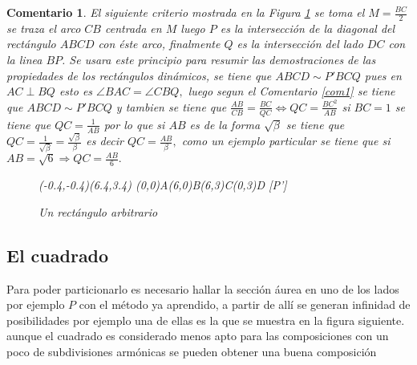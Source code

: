 \documentclass[a4paper]{book}
\newtheorem{comen}{Comentario}[chapter]
\begin{document}
\begin{comen}

	El siguiente criterio mostrada en la Figura \ref{Upu} se toma el $M=\frac{BC}{2}$ se traza el arco $CB$ centrada en $M$ luego $P$ es la intersección de la diagonal del rectángulo $ABCD$ con éste arco, finalmente $Q$ es la intersección del lado $DC$ con la linea $BP$. Se usara este principio para resumir las demostraciones de las propiedades de los rectángulos dinámicos, se tiene que $ABCD\sim P'BCQ$ pues en $AC\perp BQ$ esto es $\angle{BAC}=\angle{CBQ},$
	luego segun el Comentario \ref{com1} se tiene que $ABCD\sim P'BCQ$ y tambien se tiene que $\frac{AB}{CB}=\frac{BC}{QC}\Longleftrightarrow QC=\frac{BC^2}{AB}$ si $BC=1$ se tiene que $QC=\frac{1}{AB}$ por lo que si $AB$ es de la forma $\sqrt{\beta}$ se tiene que $QC=\frac{1}{\sqrt{\beta}}=\frac{\sqrt{\beta}}{\beta}$ es decir $QC=\frac{AB}{\beta},$ como un ejemplo particular se tiene que si $AB=\sqrt{6}\Longrightarrow QC=\frac{AB}{6}.$

	\begin{figure}[!ht]
		\begin{center}
			\begin{pspicture}(-0.4,-0.4)(6.4,3.4)
				\pstGeonode[CurveType=polygon,unit=1,PosAngle={-90,-90,90,90}](0,0){A}(6,0){B}(6,3){C}(0,3){D}
				[P']
			\end{pspicture}
		\end{center}
		\caption{Un rectángulo arbitrario}\label{Upu}
	\end{figure}

\end{comen}



\subsection{El cuadrado}
Para poder particionarlo es necesario hallar la sección áurea en uno de los lados por ejemplo $P$ con el método ya aprendido, a partir de allí se generan infinidad de posibilidades  por ejemplo una de ellas es la que se muestra en la figura siguiente. aunque el cuadrado es considerado menos apto para las composiciones con un poco de subdivisiones armónicas se pueden obtener una buena composición
\end{document}
